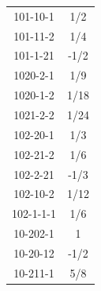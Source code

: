 \begin{tabular}[t]{|cc|}
101-10-1 &  1/2\\
101-11-2 &  1/4\\
101-1-21 &  -1/2\\
1020-2-1 &  1/9\\
1020-1-2 &  1/18\\
1021-2-2 &  1/24\\
102-20-1 &  1/3\\
102-21-2 &  1/6\\
102-2-21 &  -1/3\\
102-10-2 &  1/12\\
102-1-1-1 &  1/6\\
10-202-1 &  1\\
10-20-12 &  -1/2\\
10-211-1 &  5/8\\
\hline
\end{tabular}
